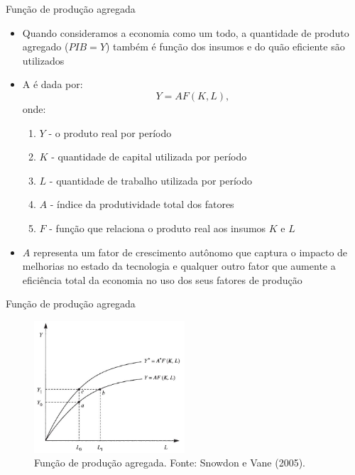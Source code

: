 \documentclass[10pt]{beamer}
\begin{document}
\begin{frame}{Função de produção agregada}
    \begin{itemize}
        \item Quando consideramos a economia como um todo, a quantidade de produto agregado ($PIB = Y$) também é função dos insumos e do quão eficiente são utilizados\medskip

        \item A  é dada por:
              \begin{equation}
                  Y = AF(K,L),
                  \label{eq1}
              \end{equation}
              onde:
              \begin{enumerate}
                  \item $Y$ - o produto real por período

                  \item $K$ - quantidade de capital utilizada por período

                  \item $L$ - quantidade de trabalho utilizada por período

                  \item $A$ - índice da produtividade total dos fatores

                  \item $F$ - função que relaciona o produto real aos insumos $K$ e $L$\medskip
              \end{enumerate}

        \item $A$ representa um fator de crescimento autônomo que captura o impacto de melhorias no estado da tecnologia e qualquer outro fator que aumente a eficiência total da economia no uso dos seus fatores de produção
    \end{itemize}
\end{frame}

\begin{frame}{Função de produção agregada}
    \begin{figure}
        \centering
        \includegraphics[width=0.5\textwidth]{./figures/aula02_funcaodeproducao.JPG}
        \caption{Função de produção agregada. Fonte: Snowdon e Vane (2005).}
        \label{funcao_producao}
    \end{figure}
\end{frame}
\end{document}
